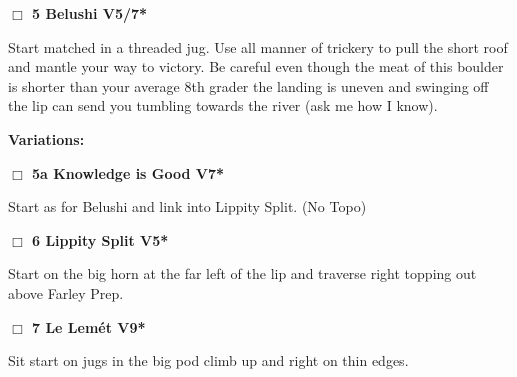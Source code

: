 	\begin{multicols}{2}


\needspace{2em}
\label{rt:Belushi}
\colorbox{RoyalBlue!20}{
\parbox{0.95\linewidth}{
\hspace{-1ex}\textbf{$\Box$
5 Belushi V5/7*  \warn
}}}
\begin{adjustwidth}{1.3em}{}			

Start matched in a threaded jug. Use all manner of trickery to pull the short roof and mantle your way to victory. Be careful even though the meat of this boulder is shorter than your average 8th grader the landing is uneven and swinging off the lip can send you tumbling towards the river (ask me how I know).
\end{adjustwidth}


\begin{adjustwidth}{0.5cm}{}				
\needspace{4em}
\textbf{Variations:} \newline

\needspace{2em}
\label{vr:Knowledge is Good}
\colorbox{Goldenrod!20}{
\parbox{0.95\linewidth}{
\hspace{-1ex}\textbf{$\Box$
5a Knowledge is Good V7*  
}}}
\begin{adjustwidth}{1.3em}{}			

Start as for Belushi and link into Lippity Split.
  (No Topo)
\end{adjustwidth}



\end{adjustwidth}


\needspace{2em}
\label{rt:Lippity Split}
\colorbox{RoyalBlue!20}{
\parbox{0.95\linewidth}{
\hspace{-1ex}\textbf{$\Box$
6 Lippity Split V5*  
}}}
\begin{adjustwidth}{1.3em}{}			

Start on the big horn at the far left of the lip and traverse right topping out above Farley Prep.
\end{adjustwidth}




\needspace{2em}
\label{rt:Le Lemét}
\colorbox{Goldenrod!20}{
\parbox{0.95\linewidth}{
\hspace{-1ex}\textbf{$\Box$
7 Le Lemét V9*  
}}}
\begin{adjustwidth}{1.3em}{}			

Sit start on jugs in the big pod climb up and right on thin edges.
\end{adjustwidth}





\end{multicols}
